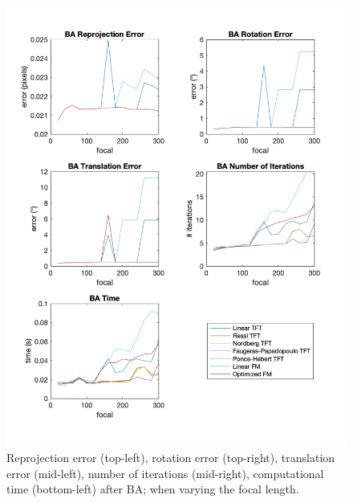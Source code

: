 \begin{figure}[p]
	\centering
	\includegraphics[width=1\textwidth]{Experiments/Synthetic/focal/BAfocalPlots.png}
	\caption[Synthetic Trial varying Focal Length with \acs{BA}]{Reprojection error (top-left), rotation error (top-right), translation error (mid-left), number of iterations (mid-right), computational time (bottom-left) after \acs{BA}; when varying the focal length.}
	\label{fig:BAFocalPlot}
\end{figure}

